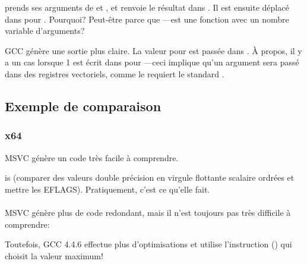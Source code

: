  prends ses arguments de  et , et renvoie le résultat dans
.
Il est ensuite déplacé dans \RDX pour \printf.
Pourquoi?
Peut-être parce que \printf{}---est une fonction avec un nombre variable d'arguments?



GCC génère une sortie plus claire.
La valeur pour \printf est passée dans .
À propos, il y a un cas lorsque 1 est écrit dans \EAX pour \printf ---ceci implique
qu'un argument sera passé dans des registres vectoriels, comme le requiert le standard
\SysVABI.

\subsection{Exemple de comparaison}



\subsubsection{x64}



MSVC \Optimizing génère un code très facile à comprendre.

 is  (comparer des valeurs double précision en virgule flottante scalaire
ordrées et mettre les EFLAGS). Pratiquement, c'est ce qu'elle fait.\\
\\
MSVC \NonOptimizing génère plus de code redondant, mais il n'est toujours pas très
difficile à comprendre:



Toutefois, GCC 4.4.6 effectue plus d'optimisations et utilise l'instruction 
() qui choisit la
valeur maximum!



